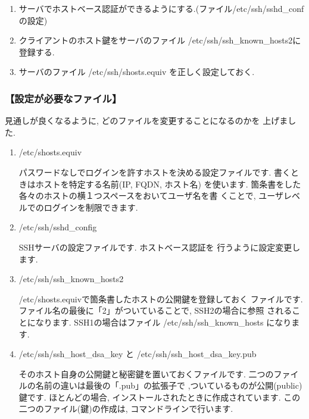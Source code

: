 \documentclass[a4paper,titlepage]{jreport}
\begin{document}
\begin{enumerate}
\item サーバでホストベース認証ができるようにする.(ファイル/etc/ssh/sshd\_confの設定)

\item クライアントのホスト鍵をサーバのファイル /etc/ssh/ssh\_known\_hosts2に登録する.

\item サーバのファイル /etc/ssh/shosts.equiv を正しく設定しておく.
\end{enumerate}

\subsubsection{【設定が必要なファイル】}
見通しが良くなるように, どのファイルを変更することになるのかを
上げました.

\begin{enumerate}
\item /etc/shosts.equiv

          パスワードなしでログインを許すホストを決める設定ファイルです.
          書くときはホストを特定する名前(IP, FQDN, ホスト名) を使います.
          箇条書をした各々のホストの横１つスペースをおいてユーザ名を書
          くことで, ユーザレベルでのログインを制限できます.

\item /etc/ssh/sshd\_config

          SSHサーバの設定ファイルです. ホストベース認証を
          行うように設定変更します. 

\item /etc/ssh/ssh\_known\_hosts2

          /etc/shosts.equivで箇条書したホストの公開鍵を登録しておく
          ファイルです.
          ファイル名の最後に「2」がついていることで, SSH2の場合に参照
          されることになります.
          SSH1の場合はファイル /etc/ssh/ssh\_known\_hosts になります.

\item /etc/ssh/ssh\_host\_dsa\_key と /etc/ssh/ssh\_host\_dsa\_key.pub

          そのホスト自身の公開鍵と秘密鍵を置いておくファイルです.
          二つのファイルの名前の違いは最後の「.pub」の拡張子で
          ,ついているものが公開(public)鍵です.
          ほとんどの場合, インストールされたときに作成されています. 
          この二つのファイル(鍵)の作成は, コマンドラインで行います.

\end{enumerate}
\end{document}
